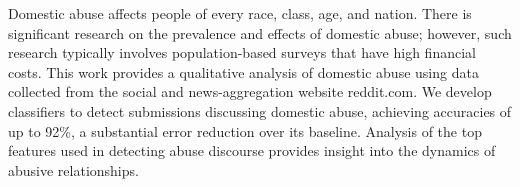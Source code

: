 Domestic abuse affects people of every race, class, age, and nation. There is significant research on the prevalence and effects of domestic abuse; however, such research typically involves population-based surveys that have high financial costs. This work provides a qualitative analysis of domestic abuse using data collected from the social and news-aggregation website reddit.com. We develop classifiers to detect submissions discussing domestic abuse, achieving accuracies of up to 92\%, a substantial error reduction over its baseline. Analysis of the top features used in detecting abuse discourse provides insight into the dynamics of abusive relationships.
